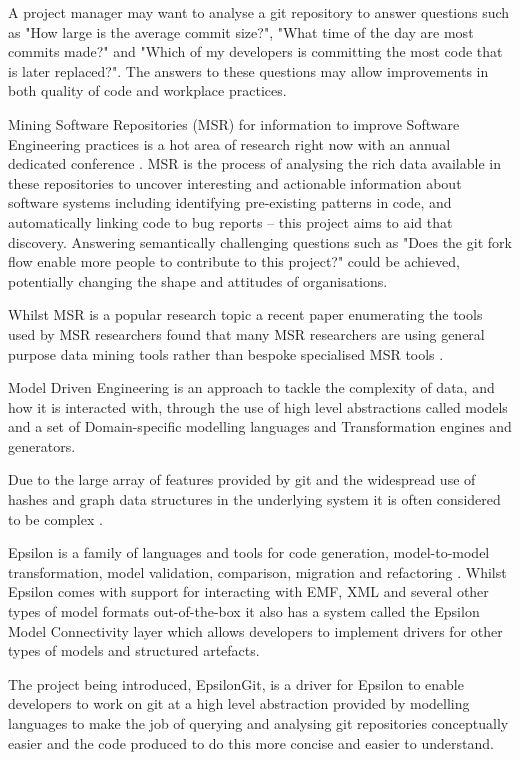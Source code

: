 \documentclass[runningheads,a4paper]{llncs}
\begin{document}
A project manager may want to analyse a git repository to answer questions such as "How large is the average commit size?", "What time of the day are most commits made?" and "Which of my developers is committing the most code that is later replaced?". The answers to these questions may allow improvements in both quality of code and workplace practices.

Mining Software Repositories (MSR) for information to improve Software Engineering practices is a hot area of research right now with an annual dedicated conference \cite{msr2015}. MSR is the process of analysing the rich data available in these repositories to uncover interesting and actionable information about software systems \cite{theroadagainformsr} including identifying pre-existing patterns in code, and automatically linking code to bug reports -- this project aims to aid that discovery. Answering semantically challenging questions such as "Does the git fork flow enable more people to contribute to this project?" could be achieved, potentially changing the shape and attitudes of organisations.

Whilst MSR is a popular research topic a recent paper enumerating the tools used by MSR researchers found that many MSR researchers are using general purpose data mining tools rather than bespoke specialised MSR tools \cite{toolsinminingsoftwarerepositories}.

Model Driven Engineering is an approach to tackle the complexity of data, and how it is interacted with, through the use of high level abstractions called models \cite{modeldrivenengineering} and a set of Domain-specific modelling languages and Transformation engines and generators.   
	
Due to the large array of features provided by git and the widespread use of hashes and graph data structures in the underlying system it is often considered to be complex \cite{gitcomplex}\cite{githard}\cite{gitmixedmetaphors}.

Epsilon is a family of languages and tools for code generation, model-to-model transformation, model validation, comparison, migration and refactoring \cite{epsilonhomepage}. Whilst Epsilon comes with support for interacting with EMF, XML and several other types of model formats out-of-the-box it also has a system called the Epsilon Model Connectivity layer which allows developers to implement drivers for other types of models and structured artefacts.

The project being introduced, EpsilonGit, is a driver for Epsilon to enable developers to work on git at a high level abstraction provided by modelling languages to make the job of querying and analysing git repositories conceptually easier and the code produced to do this more concise and easier to understand.  
\end{document}
